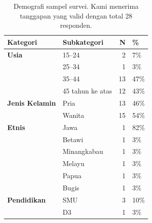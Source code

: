 \documentclass[lettersize,journal]{IEEEtran}
\begin{document}
\begin{table}[h!]
  \centering
  \caption{Demografi sampel survei. Kami menerima tanggapan yang valid dengan total 28 responden.}
  \begin{tabular}{@{}llrl@{}}
    \toprule
    \textbf{Kategori}                              & \textbf{Subkategori}                     & \textbf{N} & \textbf{\%} \\ \midrule
    \textbf{Usia}                                  & 15--24                                   & 2         & 7\%        \\
                                                   & 25--34                                   & 1        & 3\%        \\
                                                   & 35--44                                   & 13         & 47\%        \\
                                                   & 45 tahun ke atas                            & 12         & 43\%        \\ \midrule
    \textbf{Jenis Kelamin}                         & Pria                                     & 13        & 46\%        \\
                                                   & Wanita                                   & 15        & 54\%        \\   \midrule
    \textbf{Etnis}                                 & Jawa                                    & 1        & 82\%        \\
                                                   & Betawi                                   & 1         & 3\%        \\
                                                   & Minangkabau                               & 1         & 3\%        \\
                                                   & Melayu                                     & 1         & 3\%         \\
                                                   & Papua                                      & 1          & 3\%             \\
                                                   & Bugis                                      & 1          & 3\%         \\ \midrule
    \textbf{Pendidikan}                            & SMU                                      & 3         & 10\%        \\
                                                   & D3                                        & 1         & 3\%         \\

\end{tabular}
\end{table}
\end{document}
